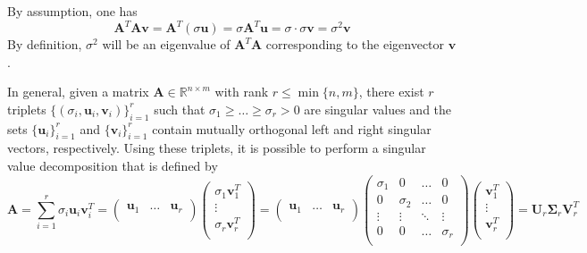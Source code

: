 \documentclass{report}
\begin{document}
\begin{proofbox}
    By assumption, one has
    \[\mathbf{A}^T\mathbf{Av} = \mathbf{A}^T(\sigma\mathbf{u}) = \sigma\mathbf{A}^T\mathbf{u} = \sigma \cdot \sigma\mathbf{v} = \sigma^2\mathbf{v}\]
    By definition, $\displaystyle \sigma^2$ will be an eigenvalue of $\displaystyle \mathbf{A}^T\mathbf{A}$ corresponding to the eigenvector $\displaystyle \mathbf{v}$.
\end{proofbox}
\noindent In general, given a matrix $\displaystyle \mathbf{A} \in \mathbb{R}^{n \times m}$ with rank $\displaystyle r \leq \min\{n, m\}$, there exist $\displaystyle r$ triplets $\displaystyle \{(\sigma_i, \mathbf{u}_i, \mathbf{v}_i)\}_{i = 1}^r$ such that $\displaystyle \sigma_1 \ge \dots \ge \sigma_r > 0$ are singular values and the sets $\displaystyle \{\mathbf{u}_i\}_{i = 1}^r$ and $\displaystyle \{\mathbf{v}_i\}_{i = 1}^r$ contain mutually orthogonal left and right singular vectors, respectively. \newline
Using these triplets, it is possible to perform a singular value decomposition that is defined by
\[\mathbf{A} = \sum_{i = 1}^r \sigma_i\mathbf{u}_i\mathbf{v}_i^T = \begin{pmatrix}
    \mathbf{u}_1 & \dots & \mathbf{u}_r \\
\end{pmatrix}\begin{pmatrix}
    \sigma_1\mathbf{v}_1^T \\
    \vdots \\
    \sigma_r\mathbf{v}_r^T \\
\end{pmatrix} = \begin{pmatrix}
    \mathbf{u}_1 & \dots & \mathbf{u}_r \\
\end{pmatrix}\begin{pmatrix}
    \sigma_1 & 0 & \dots & 0 \\
    0 & \sigma_2 & \dots & 0 \\
    \vdots & \vdots & \ddots & \vdots \\
    0 & 0 & \dots & \sigma_r \\
\end{pmatrix}\begin{pmatrix}
    \mathbf{v}_1^T \\
    \vdots \\
    \mathbf{v}_r^T \\
\end{pmatrix} = \mathbf{U}_r\mathbf{\Sigma}_r\mathbf{V}_r^T\]
\end{document}
